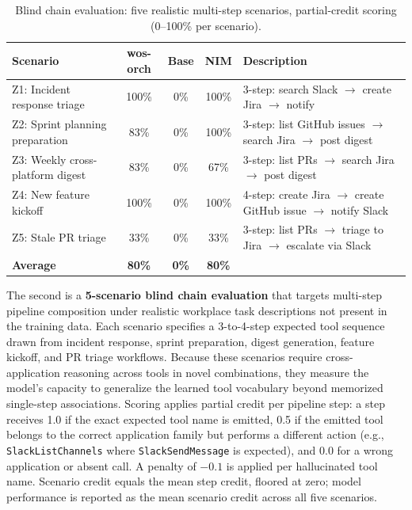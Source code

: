 \documentclass[conference]{IEEEtran}
\begin{document}
\begin{table}[!t]
\caption{Blind chain evaluation: five realistic multi-step scenarios, partial-credit scoring (0--100\% per scenario).}
\label{tab:blind_chains}
\centering\footnotesize\setlength{\tabcolsep}{4pt}
\renewcommand{\arraystretch}{1.15}
\begin{tabular}{@{}lcccp{3.4cm}@{}}
\toprule
\textbf{Scenario} & \textbf{wos-orch} & \textbf{Base} & \textbf{NIM} & \textbf{Description} \\
\midrule
Z1: Incident response triage    & 100\% & 0\% & 100\% & 3-step: search Slack $\to$ create Jira $\to$ notify \\
Z2: Sprint planning preparation & 83\%  & 0\% & 100\% & 3-step: list GitHub issues $\to$ search Jira $\to$ post digest \\
Z3: Weekly cross-platform digest& 83\%  & 0\% & 67\%  & 3-step: list PRs $\to$ search Jira $\to$ post digest \\
Z4: New feature kickoff         & 100\% & 0\% & 100\% & 4-step: create Jira $\to$ create GitHub issue $\to$ notify Slack \\
Z5: Stale PR triage             & 33\%  & 0\% & 33\%  & 3-step: list PRs $\to$ triage to Jira $\to$ escalate via Slack \\
\midrule
\textbf{Average}                & \textbf{80\%} & \textbf{0\%} & \textbf{80\%} & \\
\bottomrule
\end{tabular}
\end{table}

The second is a \textbf{5-scenario blind chain evaluation} that targets multi-step pipeline composition under realistic workplace task descriptions not present in the training data. Each scenario specifies a 3-to-4-step expected tool sequence drawn from incident response, sprint preparation, digest generation, feature kickoff, and PR triage workflows. Because these scenarios require cross-application reasoning across tools in novel combinations, they measure the model's capacity to generalize the learned tool vocabulary beyond memorized single-step associations. Scoring applies partial credit per pipeline step: a step receives 1.0 if the exact expected tool name is emitted, 0.5 if the emitted tool belongs to the correct application family but performs a different action (e.g., \texttt{SlackListChannels} where \texttt{SlackSendMessage} is expected), and 0.0 for a wrong application or absent call. A penalty of $-0.1$ is applied per hallucinated tool name. Scenario credit equals the mean step credit, floored at zero; model performance is reported as the mean scenario credit across all five scenarios.
\end{document}
